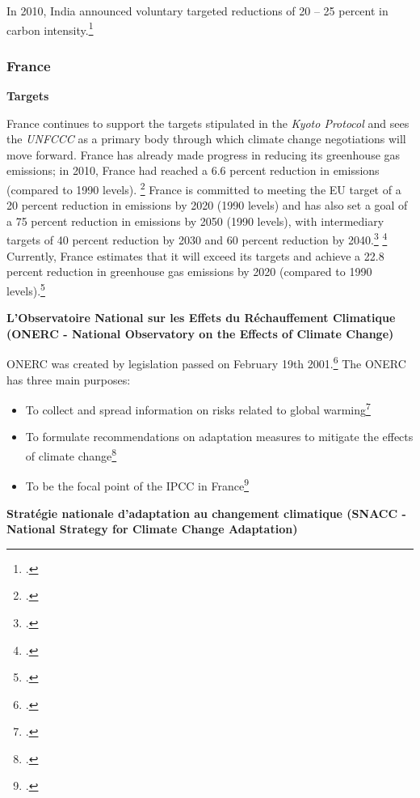 In 2010, India announced voluntary targeted reductions of 20 -- 25 percent in carbon intensity.\footcite[][p. 108]{UNHumanDev2013}



	\subsubsection{France}
	


\textbf{Targets}



France continues to support the targets stipulated in the \emph{Kyoto Protocol} and sees the \emph{UNFCCC} as a primary body through which climate change negotiations will move forward. 
France has already made progress in reducing its greenhouse gas emissions; in 2010, France had reached a 6.6 percent reduction in emissions (compared to 1990 levels). \footcite[][]{FranceEmission}
France is committed to meeting the EU target of a 20 percent reduction in emissions by 2020 (1990 levels) and has also set a goal of a 75 percent reduction in emissions by 2050 (1990 levels), with intermediary targets of 40 percent reduction by 2030 and 60 percent reduction by 2040.\footcite[][]{Reduction2050} \footcite[][]{IntermediaryTargets}
Currently, France estimates that it will exceed its targets and achieve a 22.8 percent reduction in greenhouse gas emissions by 2020 (compared to 1990 levels).\footcite[][]{Reduction2020}



\textbf{L’Observatoire National sur les Effets du Réchauffement Climatique (ONERC - National Observatory on the Effects of Climate Change)}



ONERC was created by legislation passed on February 19th 2001.\footcite[][]{ONERC}
The ONERC has three main purposes:
\begin{itemize}
	\item To collect and spread information on risks related to global warming\footcite[][]{Reduction2020}
	\item To formulate recommendations on adaptation measures to mitigate the effects of climate change\footcite[][]{Reduction2020}
	\item To be the focal point of the IPCC in France\footcite[][]{ONERC}
\end{itemize}



\textbf{Stratégie nationale d’adaptation au changement climatique (SNACC - National Strategy for Climate Change Adaptation)}



